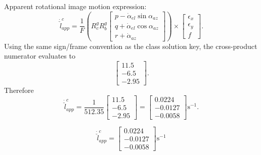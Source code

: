 \documentclass[11pt,a4paper]{article}
\begin{document}
Apparent rotational image motion expression:
\[
\dot{\check l}_{app}^c=
\frac{1}{F}
\left(
R_c^gR_b^g
\begin{bmatrix}
p-\dot\alpha_{el}\sin\alpha_{az}\\
q+\dot\alpha_{el}\cos\alpha_{az}\\
r+\dot\alpha_{az}
\end{bmatrix}
\right)\times
\begin{bmatrix}
\epsilon_x\\ \epsilon_y\\ f
\end{bmatrix}.
\]
Using the same sign/frame convention as the class solution key, the cross-product numerator evaluates to
\[
\begin{bmatrix}
11.5\\-6.5\\-2.95
\end{bmatrix}.
\]
Therefore
\[
\dot{\check l}_{app}^c
=\frac{1}{512.35}
\begin{bmatrix}
11.5\\-6.5\\-2.95
\end{bmatrix}
=
\begin{bmatrix}
0.0224\\-0.0127\\-0.0058
\end{bmatrix}\text{s}^{-1}.
\]

\[
\boxed{
\dot{\check l}_{app}^c=
\begin{bmatrix}
0.0224\\-0.0127\\-0.0058
\end{bmatrix}\text{s}^{-1}
}
\]
\end{document}

